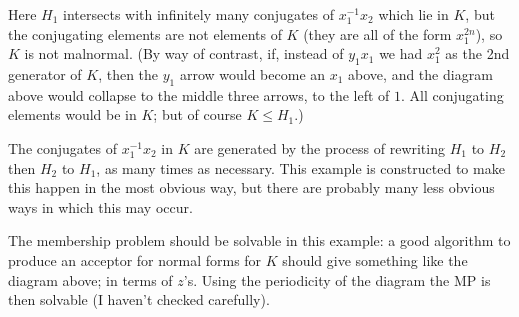\documentclass[a4paper,12pt]{article}
\numberwithin{equation}{section}
\numberwithin{figure}{section}
\begin{document}
Here $H_1$ intersects with infinitely many conjugates of $x_1^{-1}x_2$ which lie in $K$, but
the conjugating elements are not elements of $K$ (they are all of the form $x_1^{2n}$), so 
$K$ is not malnormal. 
(By way of contrast, if, instead of 
$y_1x_1$ we had $x_1^2$ as the 2nd generator of $K$, then the $y_1$ arrow would become an $x_1$ 
above, and the diagram above would collapse to the middle three arrows, to the left of $1$.
All conjugating elements would be in $K$; but of course $K\le H_1$.)

The conjugates of  $x_1^{-1}x_2$ in $K$ are generated by the process of rewriting $H_1$ to $H_2$ then
$H_2$ to $H_1$, as many times as necessary. 
This example is constructed to make this happen in the most obvious way, but
there are probably many less obvious ways in which this may occur.

The membership problem should be solvable in this example: a good algorithm to produce
an acceptor for normal forms for $K$ should give something like the diagram above; in terms of $z$'s. 
Using the periodicity of the diagram the MP is then solvable (I haven't checked carefully).
 
\end{document}
